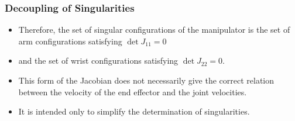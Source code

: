 \begin{frame}
    \frametitle{Decoupling of Singularities}

    \begin{itemize}
        \item Therefore, the set of singular configurations of the manipulator is 
        the set of arm configurations satisfying $\det J_{11} = 0$
        \item and the set of wrist configurations satisfying $\det J_{22} = 0$.
        \item This form of the Jacobian does not necessarily give the correct
        relation between the velocity of the end effector and the joint
        velocities.
        \item It is intended only to simplify the determination of
        singularities.
    \end{itemize}
\end{frame}



